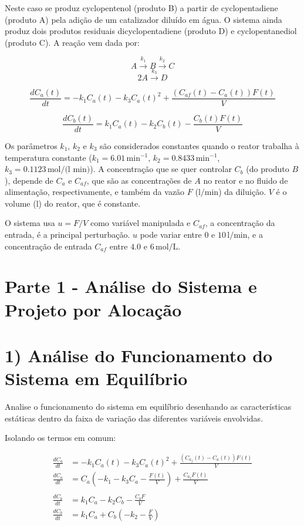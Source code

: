 \documentclass[a4paper,12pt]{report}
\begin{document}
  Neste caso se produz cyclopentenol (produto B) a partir de cyclopentadiene (produto A) pela adição de um 
catalizador diluído em água. O sistema ainda produz dois produtos residuais dicyclopentadiene (produto D) 
e cyclopentanediol (produto C). A reação vem dada por:
  
\[ A \xrightarrow{k_1} B \xrightarrow{k_2} C \]
\[ 2A \xrightarrow{k_3} D\]

\[
\frac{dC_a(t)}{dt} = -k_1 C_a(t) - k_3 C_a(t)^2 + \frac{(C_{af}(t) - C_a(t)) F(t)}{V}
\]

\[
\frac{dC_b(t)}{dt} = k_1 C_a(t) - k_2 C_b(t) - \frac{C_b(t) F(t)}{V}
\]

Os parâmetros \( k_1 \), \( k_2 \) e \( k_3 \) são considerados constantes quando o reator trabalha à temperatura constante 
(\( k_1 = 6.01 \, \text{min}^{-1} \), \( k_2 = 0.8433 \, \text{min}^{-1} \), \( k_3 = 0.1123 \, \text{mol/(l min)} \)). 
A concentração que se quer controlar \( C_b \) (do produto \( B \)), depende de \( C_a \) e \( C_{af} \), que são as 
concentrações de \( A \) no reator e no fluido de alimentação, respectivamente, e também da vazão \( F \) 
(\( \text{l/min} \)) da diluição. \( V \) é o volume (\( \text{l} \)) do reator, que é constante.

O sistema usa \( u = F/V \) como variável manipulada e \( C_{af} \), a concentração da entrada, é a principal perturbação. 
\( u \) pode variar entre \( 0 \) e \( 10 \, \text{l/min} \), e a concentração de entrada \( C_{af} \) entre \( 4.0 \) e \( 6 \, \text{mol/L} \).



\section*{Parte 1 -  Análise do Sistema e Projeto por Alocação}
\section{1) Análise do Funcionamento do Sistema em Equilíbrio}

Analise o funcionamento do sistema em equilíbrio desenhando as características estáticas dentro da faixa de variação das diferentes variáveis envolvidas.

Isolando os termos em comum:

\begin{align}
\frac{dC_a}{dt} &= -k_1 C_a(t) - k_3 C_a(t)^2 + \frac{(C_{a_f}(t)- C_a(t))F(t)}{V} \\
\frac{dC_a}{dt} &= C_a(-k_1 - k_3 C_a -  \frac{F(t)}{V})+\frac{C_{a_f} F(t)}{V} \\
\\
\frac{dC_b}{dt} &= k_1 C_a - k_2 C_b - \frac{C_b F}{V} \\
\frac{dC_b}{dt} &= k_1 C_a + C_b(-k_2 - \frac{F}{V})
\end{align}
\end{document}
